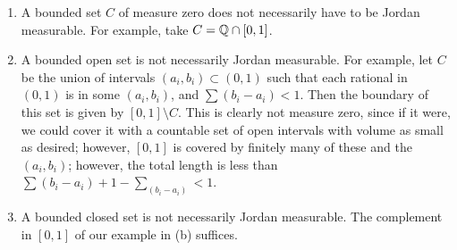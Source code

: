 \begin{enumerate}[label=(\alph*)]
    \item A bounded set $C$ of measure zero does not necessarily have to be Jordan measurable. For example, take $C = \mathbb Q \cap [0, 1]$.
    \item A bounded open set is not necessarily Jordan measurable. For example, let $C$ be the union of intervals $(a_i, b_i) \subset (0, 1)$ such that each rational in $(0, 1)$ is in some $(a_i, b_i)$, and $\sum (b_i - a_i) < 1$. Then the boundary of this set is given by $[0, 1] \setminus C$. This is clearly not measure zero, since if it were, we could cover it with a countable set of open intervals with volume as small as desired; however, $[0, 1]$ is covered by finitely many of these and the $(a_i, b_i)$; however, the total length is less than $\sum (b_i - a_i) + 1 - \sum_(b_i - a_i) < 1$.
    \item A bounded closed set is not necessarily Jordan measurable. The complement in $[0, 1]$ of our example in (b) suffices.
\end{enumerate} 